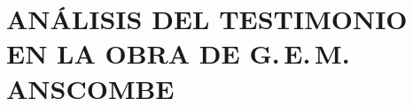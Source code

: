 \documentclass[./main.tex]{subfiles}
\begin{document}
\setcounter{chapter}{2}

\chapter{ANÁLISIS DEL TESTIMONIO EN LA OBRA DE G.\,E.\,M. ANSCOMBE}




\end{document}
